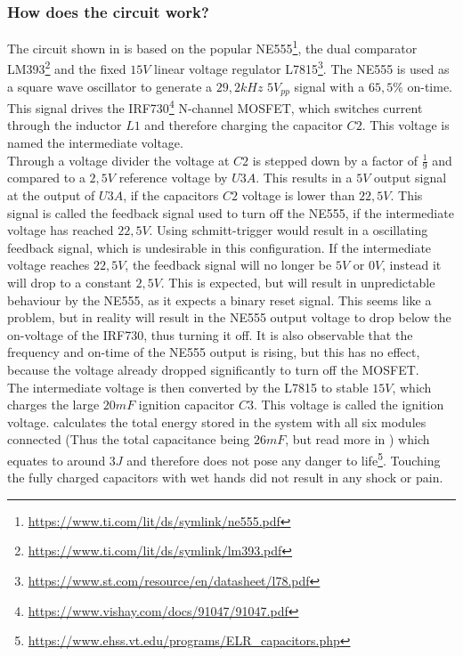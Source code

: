 \pagebreak

\subsubsection{How does the circuit work?}

\noindent The circuit shown in  is based on the popular NE555\footnote{\url{ https://www.ti.com/lit/ds/symlink/ne555.pdf}}, the dual comparator LM393\footnote{\url{https://www.ti.com/lit/ds/symlink/lm393.pdf}} and the fixed $15V$ linear voltage regulator L7815\footnote{\url{https://www.st.com/resource/en/datasheet/l78.pdf}}. The NE555 is used as a square wave oscillator to generate a $29,2kHz$ $5V_{pp}$ signal with a $65,5\%$ on-time. This signal drives the IRF730\footnote{\url{https://www.vishay.com/docs/91047/91047.pdf}} N-channel MOSFET, which switches current through the inductor $L1$ and therefore charging the capacitor $C2$. This voltage is named the intermediate voltage.\\

\noindent Through a voltage divider the voltage at $C2$ is stepped down by a factor of $\frac{1}{9}$ and compared to a $2,5V$ reference voltage by $U3A$. This results in a $5V$ output signal at the output of $U3A$, if the capacitors $C2$ voltage is lower than $22,5V$. This signal is called the feedback signal used to turn off the NE555, if the intermediate voltage has reached $22,5V$. Using schmitt-trigger would result in a oscillating feedback signal, which is undesirable in this configuration. If the intermediate voltage reaches $22,5V$, the feedback signal will no longer be $5V$ or $0V$, instead it will drop to a constant $2,5V$. This is expected, but will result in unpredictable behaviour by the NE555, as it expects a binary reset signal. This seems like a problem, but in reality will result in the NE555 output voltage to drop below the on-voltage of the IRF730, thus turning it off. It is also observable that the frequency and on-time of the NE555 output is rising, but this has no effect, because the voltage already dropped significantly to turn off the MOSFET. \\

\noindent The intermediate voltage is then converted by the L7815 to stable $15V$, which charges the large $20mF$ ignition capacitor $C3$. This voltage is called the ignition voltage.  calculates the total energy stored in the system with all six modules connected (Thus the total capacitance being $26mF$, but read more in ) which equates to around $3J$ and therefore does not pose any  danger to life\footnote{\url{https://www.ehss.vt.edu/programs/ELR_capacitors.php}}. Touching the fully charged capacitors with wet hands did not result in any shock or pain.\\

